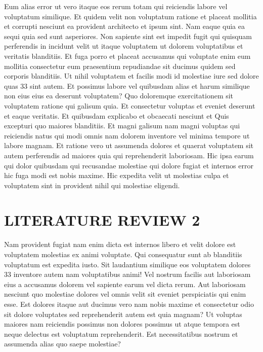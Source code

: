 \documentclass[a4paper,12pt]{report}
\begin{document}
\par Eum alias error ut vero itaque eos rerum totam qui reiciendis labore vel voluptatum similique. Et quidem velit non voluptatum ratione et placeat mollitia et corrupti nesciunt ea provident architecto et ipsum sint. Nam eaque quia ea sequi quia sed sunt asperiores. Non sapiente sint est impedit fugit qui quisquam perferendis in incidunt velit ut itaque voluptatem ut dolorem voluptatibus et veritatis blanditiis. Et fuga porro et placeat accusamus qui voluptate enim eum mollitia consectetur eum praesentium repudiandae sit ducimus quidem sed corporis blanditiis. Ut nihil voluptatem et facilis modi id molestiae iure sed dolore quas 33 sint autem. Et possimus labore vel quibusdam alias et harum similique non eius eius ea deserunt voluptatem? Quo doloremque exercitationem sit voluptatem ratione qui galisum quia. Et consectetur voluptas et eveniet deserunt et eaque veritatis. Et quibusdam explicabo et obcaecati nesciunt et Quis excepturi quo maiores blanditiis. Et magni galisum nam magni voluptas qui reiciendis natus qui modi omnis nam dolorem inventore vel minima tempore ut labore magnam. Et ratione vero ut assumenda dolores et quaerat voluptatem sit autem perferendis ad maiores quia qui reprehenderit laboriosam. Hic ipsa earum qui dolor quibusdam qui recusandae molestiae qui dolore fugiat et internos error hic fuga modi est nobis maxime. Hic expedita velit ut molestias culpa et voluptatem sint in provident nihil qui molestiae eligendi. 

\section{LITERATURE REVIEW 2}
\hspace{.5cm} Nam provident fugiat nam enim dicta est internos libero et velit dolore est voluptatem molestias ex animi voluptate. Qui consequatur sunt ab blanditiis voluptatum est expedita iusto. Sit laudantium similique eos voluptatem dolores 33 inventore autem nam voluptatibus animi! Vel nostrum facilis aut laboriosam eius a accusamus dolorem vel sapiente earum vel dicta rerum. Aut laboriosam nesciunt quo molestiae dolores vel omnis velit sit eveniet perspiciatis qui enim esse. Est dolores itaque aut ducimus vero nam nobis maxime et consectetur odio sit dolore voluptates sed reprehenderit autem est quia magnam? Ut voluptas maiores nam reiciendis possimus non dolores possimus ut atque tempora est neque delectus est voluptatum reprehenderit. Est necessitatibus nostrum et assumenda alias quo saepe molestiae?
\end{document}
